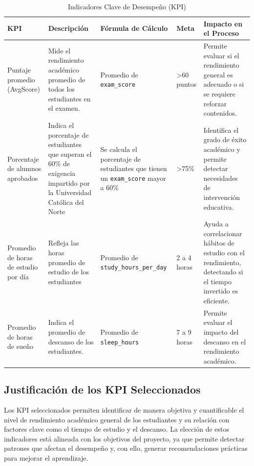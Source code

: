 \documentclass[12pt,letterpaper]{report}
\begin{document}
\begin{table}[H]
    \centering
    \begin{tabularx}{\textwidth}{|X|X|X|X|X|}
        \hline
        \textbf{KPI} & \textbf{Descripción} & \textbf{Fórmula de Cálculo} & \textbf{Meta} & \textbf{Impacto en el Proceso} \\
        \hline
        Puntaje promedio (AvgScore) & Mide el rendimiento académico promedio de todos los estudiantes en el examen. & Promedio de \texttt{exam\_score} & \textgreater 60 puntos & Permite evaluar si el rendimiento general es adecuado o si se requiere reforzar contenidos. \\
        \hline
        Porcentaje de alumnos aprobados & Indica el porcentaje de estudiantes que superan el 60\% de exigencia impartido por la Universidad Católica del Norte & Se calcula el porcentaje de estudiantes que tienen un \texttt{exam\_score} mayor a 60\% & \textgreater 75\% & Identifica el grado de éxito académico y permite detectar necesidades de intervención educativa. \\
        \hline
        Promedio de horas de estudio por día & Refleja las horas promedio de estudio de los estudiantes & Promedio de \texttt{study\_hours\_per\_day} & 2 a 4 horas & Ayuda a correlacionar hábitos de estudio con el rendimiento, detectando si el tiempo invertido es eficiente. \\
        \hline
        Promedio de horas de sueño & Indica el promedio de descanso de los estudiantes. & Promedio de \texttt{sleep\_hours} & 7 a 9 horas & Permite evaluar el impacto del descanso en el rendimiento académico. \\
        \hline
    \end{tabularx}
    \caption{Indicadores Clave de Desempeño (KPI)}
\end{table}

\subsection{Justificación de los KPI Seleccionados}
Los KPI seleccionados permiten identificar de manera objetiva y cuantificable el nivel de rendimiento académico general de los estudiantes y su relación con factores clave como el tiempo de estudio y el descanso. La elección de estos indicadores está alineada con los objetivos del proyecto, ya que permite detectar patrones que afectan el desempeño y, con ello, generar recomendaciones prácticas para mejorar el aprendizaje.

\end{document}
